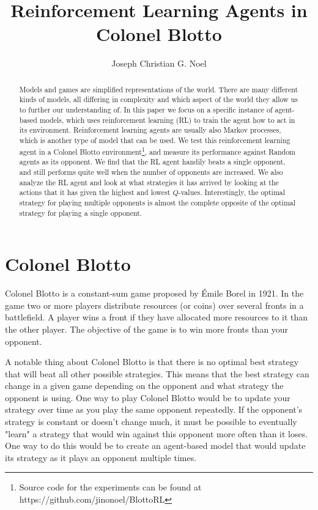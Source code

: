 \documentclass[11pt, oneside]{article}   	%
\title{Reinforcement Learning Agents in Colonel Blotto}
\author{Joseph Christian G. Noel}
\date{}							%
\begin{document}
\maketitle

\begin{abstract}
Models and games are simplified representations of the world. There are many different kinds of models, all differing in complexity and which aspect of the world they allow us to further our understanding of. In this paper we focus on a specific instance of agent-based models, which uses reinforcement learning (RL) to train the agent how to act in its environment. Reinforcement learning agents are usually also Markov processes, which is another type of model that can be used. We test this reinforcement learning agent in a Colonel Blotto environment\footnote{Source code for the experiments can be found at https://github.com/jinonoel/BlottoRL}, and measure its performance against Random agents as its opponent. We find that the RL agent handily beats a single opponent, and still performs quite well when the number of opponents are increased. We also analyze the RL agent and look at what strategies it has arrived by looking at the actions that it has given the highest and lowest $Q$-values. Interestingly, the optimal strategy for playing multiple opponents is almost the complete opposite of the optimal strategy for playing a single opponent.

 \end{abstract}
 
\section{Colonel Blotto}

Colonel Blotto is a constant-sum game proposed by Émile Borel in 1921\cite{Borel1953}. In the game two or more players distribute resources (or coins) over several fronts in a battlefield. A player wins a front if they have allocated more resources to it than the other player. The objective of the game is to win more fronts than your opponent.

\hfill

A notable thing about Colonel Blotto is that there is no optimal best strategy that will beat all other possible strategies. This means that the best strategy can change in a given game depending on the opponent and what strategy the opponent is using. One way to play Colonel Blotto would be to update your strategy over time as you play the same opponent repeatedly. If the opponent's strategy is constant or doesn't change much, it must be possible to eventually "learn" a strategy that would win against this opponent more often than it loses. One way to do this would be to create an agent-based model that would update its strategy as it plays an opponent multiple times.
\end{document}
